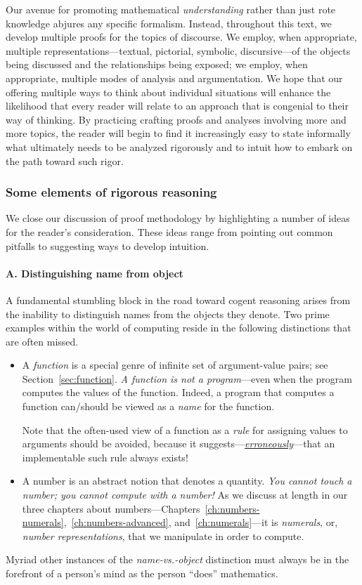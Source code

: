 Our avenue for promoting mathematical {\em understanding} rather than just rote knowledge abjures any specific formalism.  Instead, throughout this text, we develop multiple proofs for the topics of discourse.  We employ, when appropriate, multiple representations---textual, pictorial, symbolic, discursive---of the objects being discussed and the relationships being exposed; we employ, when appropriate, multiple modes of analysis and argumentation.  We hope that our offering multiple ways to think about individual situations will enhance the likelihood that every reader will relate to an approach that is congenial to their way of thinking.  By practicing crafting 
proofs and analyses involving more and more topics, the reader will begin to find it increasingly easy to state informally what ultimately needs to be analyzed rigorously and to intuit how to embark on the path toward such rigor.

\subsubsection{Some elements of rigorous reasoning}
\label{sec:elements-of-reasoning}

We close our discussion of proof methodology by highlighting a number of ideas for the reader's consideration.  These ideas range from pointing out common pitfalls to suggesting ways to develop intuition.

\paragraph{A. Distinguishing name from object}

A fundamental stumbling block in the road toward cogent reasoning arises from the inability to distinguish names from the objects they denote.  Two prime examples within the world of computing reside in the following distinctions that are often missed.
\begin{itemize}
\item
A {\it function} is a special genre of infinite set of argument-value pairs; see Section~\ref{sec:function}.  {\em A function is not a program}---even when the program computes the values of the function.  Indeed, a program that computes a function can/should be
viewed as a {\it name} for the function.

\smallskip

Note that the often-used view of a function as a {\em rule} for assigning values to arguments should be avoided, because it suggests---\underline{\em erroneously}---that an implementable such rule always exists!

\item
A number is an abstract notion that denotes a quantity.  {\em You cannot touch a number; you cannot compute with a number!}  As we discuss at length in our three chapters about numbers---Chapters~\ref{ch:numbers-numerals},~\ref{ch:numbers-advanced}, and~\ref{ch:numerals}---it is {\em numerals}, or, {\em number representations}, that we manipulate in order to compute.
\end{itemize}
Myriad other instances of the {\em name-vs.-object} distinction must always be in the forefront of a person's mind as the person ``does'' mathematics.

